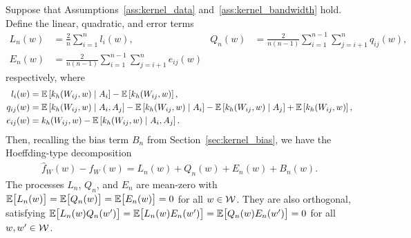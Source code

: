 \begin{lemma}
  \label{lem:kernel_hoeffding}

  Suppose that Assumptions~\ref{ass:kernel_data} and~\ref{ass:kernel_bandwidth}
  hold. Define the linear, quadratic, and error terms
  \begin{align*}
    L_n(w)
    &=
    \frac{2}{n} \sum_{i=1}^n l_i(w),
    &Q_n(w) &= \frac{2}{n(n-1)} \sum_{i=1}^{n-1} \sum_{j=i+1}^{n} q_{i j}(w), \\
    E_n(w) &= \frac{2}{n(n-1)} \sum_{i=1}^{n-1} \sum_{j=i+1}^{n} e_{i j}(w)
  \end{align*}
  respectively, where
  \begin{align*}
    l_i(w)
    &=
    \mathbb{E}\left[k_h(W_{i j},w) \mid A_i\right] - \mathbb{E}\left[k_h(W_{i j},w)\right], \\
    q_{i j}(w)
    &=
    \mathbb{E}\left[k_h(W_{i j},w) \mid A_i, A_j\right]
    - \mathbb{E}\left[k_h(W_{i j},w) \mid A_i\right]
    - \mathbb{E}\left[k_h(W_{i j},w) \mid A_j\right]
    + \mathbb{E}\left[k_h(W_{i j},w)\right], \\
    e_{i j}(w)
    &=
    k_h(W_{i j},w) - \mathbb{E}\left[k_h(W_{i j},w) \mid A_i, A_j\right].
  \end{align*}
  Then, recalling the bias term $B_n$ from Section~\ref{sec:kernel_bias},
  we have the Hoeffding-type decomposition
  \begin{align}
    \label{eq:kernel_hoeffding}
    \hat f_W(w) - f_W(w) = L_n(w) + Q_n(w) + E_n(w) + B_n(w).
  \end{align}
  The processes $L_n$, $Q_n$, and $E_n$ are mean-zero
  with $\mathbb{E}\big[L_n(w)\big] = \mathbb{E}\big[Q_n(w)\big] = \mathbb{E}\big[E_n(w)\big] = 0$
  for all $w \in \mathcal{W}$. They are also orthogonal,
  satisfying $\mathbb{E}\big[ L_n(w) Q_n(w') \big] = \mathbb{E}\big[ L_n(w) E_n(w') \big]
  = \mathbb{E}\big[ Q_n(w) E_n(w') \big] = 0$ for all $w, w' \in \mathcal{W}$.
\end{lemma}

